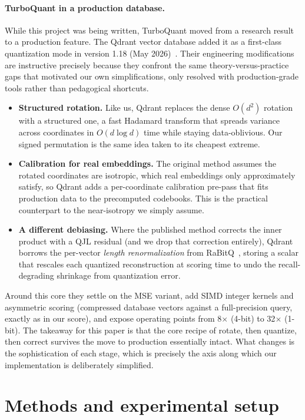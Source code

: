 \documentclass[11pt]{article}
\begin{document}
\paragraph{TurboQuant in a production database.} While this project was being written, TurboQuant moved from a research result to a production feature. The Qdrant vector database added it as a first-class quantization mode in version 1.18 (May 2026)~\cite{qdrant2026}. Their engineering modifications are instructive precisely because they confront the same theory-versus-practice gaps that motivated our own simplifications, only resolved with production-grade tools rather than pedagogical shortcuts.
\begin{itemize}
  \item \textbf{Structured rotation.} Like us, Qdrant replaces the dense $O(d^2)$ rotation with a structured one, a fast Hadamard transform that spreads variance across coordinates in $O(d \log d)$ time while staying data-oblivious. Our signed permutation is the same idea taken to its cheapest extreme.
  \item \textbf{Calibration for real embeddings.} The original method assumes the rotated coordinates are isotropic, which real embeddings only approximately satisfy, so Qdrant adds a per-coordinate calibration pre-pass that fits production data to the precomputed codebooks. This is the practical counterpart to the near-isotropy we simply assume.
  \item \textbf{A different debiasing.} Where the published method corrects the inner product with a QJL residual (and we drop that correction entirely), Qdrant borrows the per-vector \emph{length renormalization} from RaBitQ~\cite{rabitq2024}, storing a scalar that rescales each quantized reconstruction at scoring time to undo the recall-degrading shrinkage from quantization error.
\end{itemize}
Around this core they settle on the MSE variant, add SIMD integer kernels and asymmetric scoring (compressed database vectors against a full-precision query, exactly as in our score), and expose operating points from 8$\times$ (4-bit) to 32$\times$ (1-bit). The takeaway for this paper is that the core recipe of rotate, then quantize, then correct survives the move to production essentially intact. What changes is the sophistication of each stage, which is precisely the axis along which our implementation is deliberately simplified.

\section{Methods and experimental setup}
\end{document}
